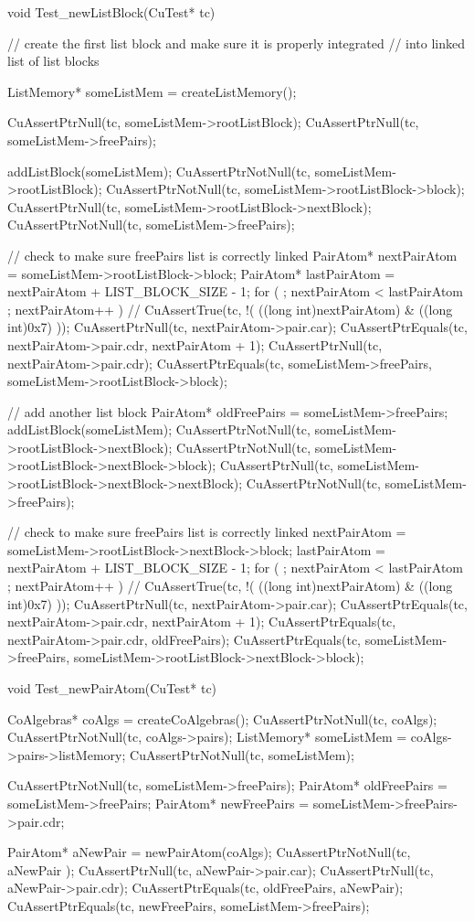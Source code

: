 void Test_newListBlock(CuTest* tc) {
  // create the first list block and make sure it is properly integrated
  // into linked list of list blocks

  ListMemory* someListMem = createListMemory();

  CuAssertPtrNull(tc, someListMem->rootListBlock);
  CuAssertPtrNull(tc, someListMem->freePairs);

  addListBlock(someListMem);
  CuAssertPtrNotNull(tc, someListMem->rootListBlock);
  CuAssertPtrNotNull(tc, someListMem->rootListBlock->block);
  CuAssertPtrNull(tc, someListMem->rootListBlock->nextBlock);
  CuAssertPtrNotNull(tc, someListMem->freePairs);

  // check to make sure freePairs list is correctly linked
  PairAtom* nextPairAtom = someListMem->rootListBlock->block;
  PairAtom* lastPairAtom = nextPairAtom + LIST_BLOCK_SIZE - 1;
  for ( ; nextPairAtom < lastPairAtom ; nextPairAtom++ ) {
//    CuAssertTrue(tc, !( ((long int)nextPairAtom) & ((long int)0x7) ));
    CuAssertPtrNull(tc, nextPairAtom->pair.car);
    CuAssertPtrEquals(tc, nextPairAtom->pair.cdr, nextPairAtom + 1);
  }
  CuAssertPtrNull(tc, nextPairAtom->pair.cdr);
  CuAssertPtrEquals(tc, someListMem->freePairs, someListMem->rootListBlock->block);

  // add another list block
  PairAtom* oldFreePairs = someListMem->freePairs;
  addListBlock(someListMem);
  CuAssertPtrNotNull(tc, someListMem->rootListBlock->nextBlock);
  CuAssertPtrNotNull(tc, someListMem->rootListBlock->nextBlock->block);
  CuAssertPtrNull(tc, someListMem->rootListBlock->nextBlock->nextBlock);
  CuAssertPtrNotNull(tc, someListMem->freePairs);

  // check to make sure freePairs list is correctly linked
  nextPairAtom = someListMem->rootListBlock->nextBlock->block;
  lastPairAtom = nextPairAtom + LIST_BLOCK_SIZE - 1;
  for ( ; nextPairAtom < lastPairAtom ; nextPairAtom++ ) {
//    CuAssertTrue(tc, !( ((long int)nextPairAtom) & ((long int)0x7) ));
    CuAssertPtrNull(tc, nextPairAtom->pair.car);
    CuAssertPtrEquals(tc, nextPairAtom->pair.cdr, nextPairAtom + 1);
  }
  CuAssertPtrEquals(tc, nextPairAtom->pair.cdr, oldFreePairs);
  CuAssertPtrEquals(tc, someListMem->freePairs, someListMem->rootListBlock->nextBlock->block);
}

void Test_newPairAtom(CuTest* tc) {
  CoAlgebras* coAlgs = createCoAlgebras();
  CuAssertPtrNotNull(tc, coAlgs);
  CuAssertPtrNotNull(tc, coAlgs->pairs);
  ListMemory* someListMem = coAlgs->pairs->listMemory;
  CuAssertPtrNotNull(tc, someListMem);

  CuAssertPtrNotNull(tc, someListMem->freePairs);
  PairAtom* oldFreePairs = someListMem->freePairs;
  PairAtom* newFreePairs = someListMem->freePairs->pair.cdr;

  PairAtom* aNewPair = newPairAtom(coAlgs);
  CuAssertPtrNotNull(tc, aNewPair );
  CuAssertPtrNull(tc, aNewPair->pair.car);
  CuAssertPtrNull(tc, aNewPair->pair.cdr);
  CuAssertPtrEquals(tc, oldFreePairs, aNewPair);
  CuAssertPtrEquals(tc, newFreePairs, someListMem->freePairs);
}

